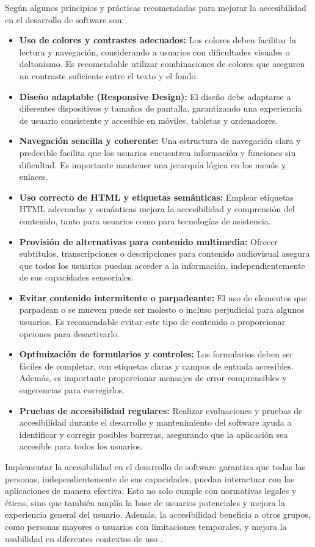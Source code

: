 Según \cite{seo2021} algunos principios y prácticas recomendadas para mejorar la accesibilidad en el desarrollo de software son:

\begin{itemize}
    \item \textbf{Uso de colores y contrastes adecuados:} Los colores deben facilitar la lectura y navegación, considerando a usuarios con dificultades visuales o daltonismo. Es recomendable utilizar combinaciones de colores que aseguren un contraste suficiente entre el texto y el fondo.
    \item \textbf{Diseño adaptable (Responsive Design):} El diseño debe adaptarse a diferentes dispositivos y tamaños de pantalla, garantizando una experiencia de usuario consistente y accesible en móviles, tabletas y ordenadores.
    \item \textbf{Navegación sencilla y coherente:} Una estructura de navegación clara y predecible facilita que los usuarios encuentren información y funciones sin dificultad. Es importante mantener una jerarquía lógica en los menús y enlaces.
    \item \textbf{Uso correcto de HTML y etiquetas semánticas:} Emplear etiquetas HTML adecuadas y semánticas mejora la accesibilidad y comprensión del contenido, tanto para usuarios como para tecnologías de asistencia.
    \item \textbf{Provisión de alternativas para contenido multimedia:} Ofrecer subtítulos, transcripciones o descripciones para contenido audiovisual asegura que todos los usuarios puedan acceder a la información, independientemente de sus capacidades sensoriales.
    \item \textbf{Evitar contenido intermitente o parpadeante:} El uso de elementos que parpadean o se mueven puede ser molesto o incluso perjudicial para algunos usuarios. Es recomendable evitar este tipo de contenido o proporcionar opciones para desactivarlo.
    \item \textbf{Optimización de formularios y controles:} Los formularios deben ser fáciles de completar, con etiquetas claras y campos de entrada accesibles. Además, es importante proporcionar mensajes de error comprensibles y sugerencias para corregirlos.
    \item \textbf{Pruebas de accesibilidad regulares:} Realizar evaluaciones y pruebas de accesibilidad durante el desarrollo y mantenimiento del software ayuda a identificar y corregir posibles barreras, asegurando que la aplicación sea accesible para todos los usuarios.
\end{itemize}

Implementar la accesibilidad en el desarrollo de software garantiza que todas las personas, independientemente de sus capacidades, puedan interactuar con las aplicaciones de manera efectiva. Esto no solo cumple con normativas legales y éticas, sino que también amplía la base de usuarios potenciales y mejora la experiencia general del usuario. Además, la accesibilidad beneficia a otros grupos, como personas mayores o usuarios 
con limitaciones temporales, y mejora la usabilidad en diferentes contextos de uso \cite{mdn2024}.


 


